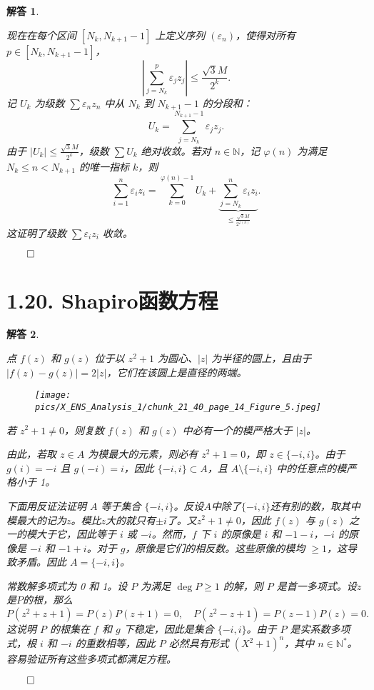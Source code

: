 \documentclass[12pt,UTF8]{ctexbook}
\theoremstyle{exercisestyle}
\theoremstyle{solutionstyle}
\newtheorem*{solution*}{解答}
\newenvironment{solution}
  {\begin{solution*}}
  {\hfill\ensuremath{\qed}\end{solution*}}
\begin{document}
\begin{solution}
\begin{subquestions}
现在在每个区间 \( [N_k, N_{k+1}-1] \) 上定义序列 \( (\varepsilon_n) \)，使得对所有 \( p \in [N_k, N_{k+1}-1] \)，
\[
\left| \sum_{j=N_k}^p \varepsilon_j z_j \right| \leqslant \frac{\sqrt{3}M}{2^k}.
\]
记 \( U_k \) 为级数 \( \sum \varepsilon_n z_n \) 中从 \( N_k \) 到 \( N_{k+1} - 1 \) 的分段和：
\[
U_k = \sum_{j=N_k}^{N_{k+1}-1} \varepsilon_j z_j.
\]
由于 \( |U_k| \leqslant \frac{\sqrt{3}M}{2^k} \)，级数 \( \sum U_k \) 绝对收敛。若对 \( n \in \mathbb{N} \)，记 \( \varphi(n) \) 为满足 \( N_k \leqslant n < N_{k+1} \) 的唯一指标 \( k \)，则
\[
\sum_{i=1}^n \varepsilon_i z_i = \sum_{k=0}^{\varphi(n)-1} U_k + \underbrace{\sum_{j=N_k}^n \varepsilon_i z_i}_{\leqslant \frac{\sqrt{3}M}{2^{\varphi(n)}}}.
\]
这证明了级数 \( \sum \varepsilon_i z_i \) 收敛。
\end{subquestions}
\end{solution}

\section{1.20. Shapiro函数方程}
\begin{solution}
  \begin{subquestions}
    \item 点 \(f(z)\) 和 \(g(z)\) 位于以 \(z^2 + 1\) 为圆心、\( |z| \) 为半径的圆上，且由于 \(|f(z) - g(z)| = 2|z|\)，它们在该圆上是直径的两端。
    \begin{figure}[htbp]
      \centering
      \texttt{[image: pics/X\_ENS\_Analysis\_1/chunk\_21\_40\_page\_14\_Figure\_5.jpeg]}
    \end{figure}
    
    若 \(z^2 + 1 \neq 0\)，则复数 \(f(z)\) 和 \(g(z)\) 中必有一个的模严格大于 \(|z|\)。
    
    由此，若取 \(z \in A\) 为模最大的元素，则必有 \(z^2 + 1 = 0\)，即 \(z \in \{-i, i\}\)。由于 \(g(i) = -i\) 且 \(g(-i) = i\)，因此 \(\{-i, i\} \subset A\)，且 \(A \setminus \{-i, i\}\) 中的任意点的模严格小于 1。
    
    下面用反证法证明 \(A\) 等于集合 \(\{-i, i\}\)。反设$A$中除了\(\{-i, i\}\)还有别的数，取其中模最大的记为$z$。模比$z$大的就只有$\pm i$了。又\(z^2 + 1 \neq 0\)，因此 \(f(z)\) 与 \(g(z)\) 之一的模大于它，因此等于 \(i\) 或 \(-i\)。然而，\(f\) 下 \(i\) 的原像是 \(i\) 和 \(-1-i\)，\(-i\) 的原像是 \(-i\) 和 \(-1+i\)。对于 \(g\)，原像是它们的相反数。这些原像的模均 \(\geqslant 1\)，这导致矛盾。因此 \(A = \{-i, i\}\)。
    
    \item 常数解多项式为 0 和 1。设 \(P\) 为满足 \(\deg P \ge 1\) 的解，则 \(P\) 是首一多项式。设$z$是$P$的根，那么
    $$P(z^2 + z + 1) = P(z)P(z + 1) = 0, \quad P(z^2 - z + 1) = P(z - 1)P(z) = 0.$$
    这说明 \(P\) 的根集在 \(f\) 和 \(g\) 下稳定，因此是集合 \(\{-i, i\}\)。由于 \(P\) 是实系数多项式，根 \(i\) 和 \(-i\) 的重数相等，因此 \(P\) 必然具有形式 \((X^2 + 1)^n\)，其中 \(n \in \mathbb{N}^*\)。容易验证所有这些多项式都满足方程。
  \end{subquestions}
\end{solution}
\end{document}
